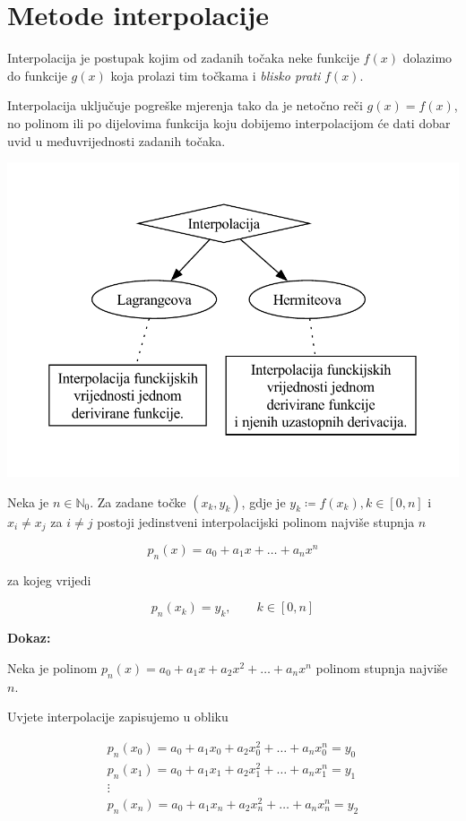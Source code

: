 \section{Metode interpolacije}

Interpolacija je postupak kojim od zadanih točaka neke funkcije $f(x)$ dolazimo
do funkcije $g(x)$ koja prolazi tim točkama i \textit{blisko prati} $f(x)$.

Interpolacija uključuje pogreške mjerenja tako da je netočno reči $g(x) = f(x)$,
no polinom ili po dijelovima funkcija koju dobijemo interpolacijom će dati
dobar uvid u međuvrijednosti zadanih točaka.

\begin{center}
    \includegraphics[width=0.5\linewidth]{interpolation.pdf}
\end{center}

\begin{theorembox}
    Neka je $n\in\mathbb{N}_0$. Za zadane točke $(x_k,y_k)$, gdje je $y_k\coloneq f(x_k), k\in[0,n]$ i $x_i\neq x_j$ za $i\neq j$ postoji jedinstveni interpolacijski polinom najviše stupnja $n$

    $$
        p_n(x)=a_0+a_1x+\dots+a_nx^n
    $$

    za kojeg vrijedi

    $$
        p_n(x_k) = y_k,\qquad k\in[0,n]
    $$
\end{theorembox}

\textbf{Dokaz:}

\bigskip

Neka je polinom $p_n(x)=a_0+a_1x+a_2x^2+\dots+a_nx^n$ polinom stupnja najviše $n$.

Uvjete interpolacije zapisujemo u obliku

\begin{gather*}
    p_n(x_0)=a_0+a_1x_0+a_2x_0^2+\dots+a_nx_0^n=y_0\\
    p_n(x_1)=a_0+a_1x_1+a_2x_1^2+\dots+a_nx_1^n=y_1\\
    \vdots\\
    p_n(x_n)=a_0+a_1x_n+a_2x_n^2+\dots+a_nx_n^n=y_2
\end{gather*}

